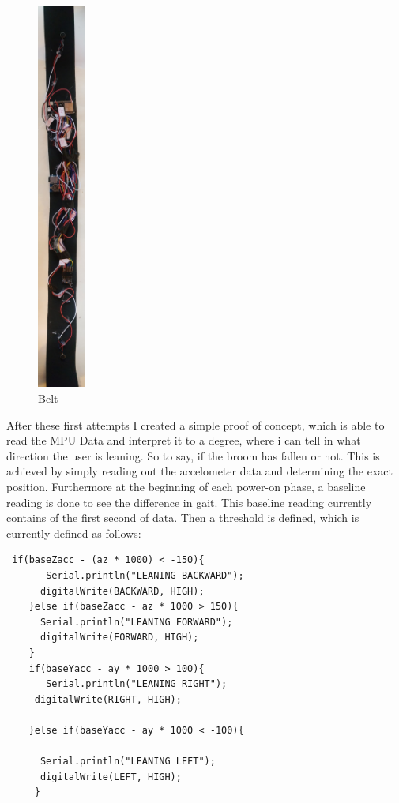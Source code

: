 \begin{figure}
\centering
\includegraphics[width=0.14\textwidth]{images/belt.jpg}
    \caption{Belt}
        \label{fig:Belt}
\end{figure}

After these first attempts I created a simple proof of concept, which is able to read the MPU Data and interpret it to a degree, where i can tell in what direction the user is leaning. So to say, if the broom has fallen or not. This is achieved by simply reading out the accelometer data and determining the exact position. Furthermore at the beginning of each power-on phase, a baseline reading is done to see the difference in gait. This baseline reading currently contains of the first second of data. Then a threshold is defined, which is currently defined as follows:

\begin{lstlisting}
 if(baseZacc - (az * 1000) < -150){
       Serial.println("LEANING BACKWARD");
      digitalWrite(BACKWARD, HIGH);
    }else if(baseZacc - az * 1000 > 150){
      Serial.println("LEANING FORWARD");
      digitalWrite(FORWARD, HIGH);
    }
    if(baseYacc - ay * 1000 > 100){
       Serial.println("LEANING RIGHT");
     digitalWrite(RIGHT, HIGH);

    }else if(baseYacc - ay * 1000 < -100){
      
      Serial.println("LEANING LEFT");
      digitalWrite(LEFT, HIGH);
     }
\end{lstlisting}

